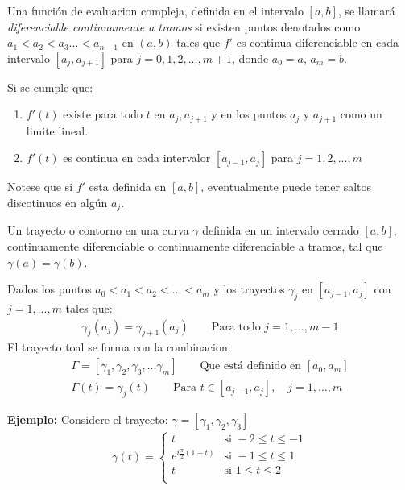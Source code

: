 \documentclass{article}
\newcommand{\caja}[3]{%
  \begin{tcolorbox}[colback=#1!5!white,colframe=#1!25!black,title=#2]
    #3
  \end{tcolorbox}%
}
\begin{document}
\caja{green}{Definicion 1 }{
  Una función de evaluacion compleja, definida en el intervalo $ [a,b] $, se llamará \textit{diferenciable continuamente a tramos} si existen puntos denotados como $ a_1<a_2<a_3...<a _{n-1 }  $ en $ (a,b) $ tales que $ f'  $ es continua diferenciable en cada intervalo $ [a_j, a _{j+1 } ] $ para $ j = 0,1,2,...,m+1  $, donde $ a_0 =a  $, $ a_m = b  $. 

  \hfill

  Si se cumple que: 
  \begin{enumerate}
    \item $ f'(t) $ existe para todo $t$ en $ a_j, a _{j+1 }  $ y en los puntos $ a_j  $ y $ a _{j+1 }  $ como un limite lineal.
    \item $ f'(t) $ es continua en cada intervalor $ [a _{j -1 } , a _j ] $ para $ j = 1,2, ..., m  $
  \end{enumerate}
  Notese que si $ f'  $ esta definida en $ [a,b ] $, eventualmente puede tener saltos discotinuos en algún $ a_j  $.
}

\caja{green}{Definicion 2 }{
  Un trayecto o contorno en una curva $ \gamma $ definida en un intervalo cerrado $ [a,b ] $, continuamente diferenciable o continuamente diferenciable a tramos, tal que $ \gamma(a) = \gamma(b)  $.
}

\caja{green}{Definicion 3 }{
  Dados los puntos $ a_0 < a_1 < a_2 < ... < a_m  $ y los trayectos $ \gamma_j  $ en $ [a _{j - 1 } , a_j ] $ con $ j = 1, ..., m  $ tales que: 
  \begin{gather*}
    \gamma_j (a_j )= \gamma _{j + 1 } (a_j ) \qquad \text{Para todo }j = 1, ..., m-1 
  \end{gather*}
  El trayecto toal se forma con la combinacion: 
  \begin{gather*}
    \Gamma = [\gamma_1, \gamma_2, \gamma_3,...\gamma_m ] \qquad \text{Que está definido en }[a_0,a_m ]\\
    \Gamma (t) = \gamma_j (t) \qquad \text{Para } t \in [a _{j-1 } , a_j ], \quad j = 1, ..., m
  \end{gather*}
}

\hfill 

\hfill

\textbf{Ejemplo: } Considere el trayecto: $ \gamma = [\gamma_1,\gamma_2,\gamma_3 ] $
\begin{gather*}
  \gamma(t) = \begin{cases}
        t & \text{si } -2\leq t \leq -1 \\
        e ^ {i \frac{\pi }{2}(1-t )} & \text{si } -1\leq t \leq 1 \\
        t & \text{si } 1\leq t \leq 2 \\
    \end{cases} 
\end{gather*}
\end{document}
